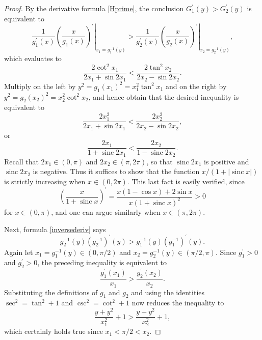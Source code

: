 \documentclass[12pt,reqno]{amsart}
\theoremstyle{definition}
\newcommand{\go}{G_1}
\newcommand{\gt}{G_2}
\newcommand{\sinc}{\operatorname{sinc}}
\begin{document}
\begin{proof}
By the derivative formula \eqref{Hprime}, the conclusion $\go^\prime(y) > \gt^\prime(y)$ is equivalent to 
\[
\left. \frac{1}{g_1^\prime(x)} \left( \frac{x}{g_1(x)} \right)^{\! \prime} \right|_{x_1=g_1^{-1}(y)}
> 
\left. \frac{1}{g_2^\prime(x)} \left( \frac{x}{g_2(x)} \right)^{\! \prime} \right|_{x_2=g_2^{-1}(y)} ,
\]
which evaluates to 
\[
\frac{2 \cot^2 x_1}{2x_1 + \sin 2x_1} < \frac{2 \tan^2 x_2}{2x_2 - \sin 2x_2} .
\]
Multiply on the left by $y^2 = g_1(x_1)^2 = x_1^2 \tan^2 x_1$ and on the right by $y^2 = g_2(x_2)^2 = x_2^2 \cot^2 x_2$, and hence obtain that the desired inequality is equivalent to 
\[
\frac{2 x_1^2}{2x_1 + \sin 2x_1} < \frac{2 x_2^2}{2x_2 - \sin 2x_2} ,
\]
or 
\[
\frac{2x_1}{1 + \sinc 2x_1} < \frac{2x_2}{1 - \sinc 2x_2} .
\]
Recall that $2x_1 \in (0,\pi)$ and $2x_2 \in (\pi,2\pi)$, so that $\sinc 2x_1$ is positive and $\sinc 2x_2$ is negative. Thus it suffices to show that the function $x/(1+|\sinc x|)$ is strictly increasing when $x \in (0,2\pi)$. This last fact is easily verified, since
\[
\left( \frac{x}{1+\sinc x} \right)^{\! \prime} = \frac{x(1-\cos x)+ 2\sin x}{x(1+\sinc x)^2} > 0
\]
for $x \in (0,\pi)$, and one can argue similarly when $x \in (\pi,2\pi)$.

Next, formula \eqref{inversederiv} says
\[
g_2^{-1}(y) (g_2^{-1})^\prime(y) > g_1^{-1}(y) (g_1^{-1})^\prime(y) .
\]
Again let $x_1=g_1^{-1}(y) \in (0,\pi/2)$ and $x_2=g_2^{-1}(y) \in (\pi/2,\pi)$. Since $g_1^\prime>0$ and $g_2^\prime>0$, the preceding inequality is equivalent to 
\[
\frac{g_1^\prime(x_1)}{x_1} > \frac{g_2^\prime(x_2)}{x_2} .
\]
Substituting the definitions of $g_1$ and $g_2$ and using the identities $\sec^2=\tan^2+1$ and $\csc^2=\cot^2+1$ now reduces the inequality to 
\[
\frac{y+y^2}{x_1^2} + 1 > \frac{y+y^2}{x_2^2} + 1,
\]
which certainly holds true since $x_1<\pi/2<x_2$.
\end{proof}
\end{document}
